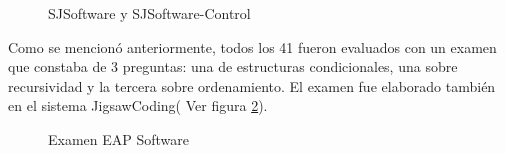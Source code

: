 \begin{figure}[!h]
	\centering
	\caption{SJSoftware y SJSoftware-Control}
	\label{fig:c5_software_sesiones}
\end{figure}

Como se mencionó anteriormente, todos los 41 fueron evaluados con un examen que constaba de 3 preguntas: una de estructuras condicionales, una sobre recursividad y la tercera sobre ordenamiento. El examen fue elaborado también en el sistema JigsawCoding( Ver figura \ref{fig:c5_software_examen}).

\begin{figure}[!h]
	\centering
	\caption{Examen EAP Software}
	\label{fig:c5_software_examen}
\end{figure}
